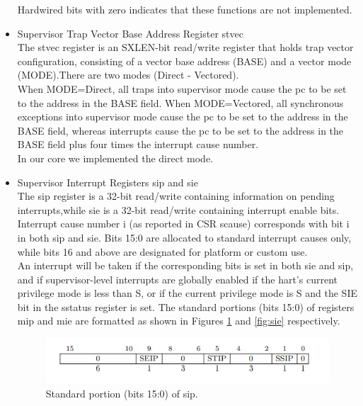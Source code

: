\documentclass[../main.tex]{subfiles}
\begin{document}
\begin{itemize}
        Hardwired bits with zero indicates that these functions are not implemented.
         
    \item Supervisor Trap Vector Base Address Register stvec \\
        The stvec register is an SXLEN-bit read/write register that holds trap vector configuration, consisting of a vector base address (BASE) and a vector mode (MODE).There are two modes (Direct - Vectored).\\ 
        When MODE=Direct, all traps into  supervisor mode cause the pc to be set to the address in the BASE field. When MODE=Vectored, all synchronous exceptions into supervisor mode cause the pc to be set to the address in the BASE field, whereas interrupts cause the pc to be set to the address in the BASE field plus four times the interrupt cause number.\\
        In our core we implemented the direct mode.
          
    \item Supervisor Interrupt Registers sip and sie\\
        The sip register is a 32-bit read/write containing information on pending interrupts,while sie is a 32-bit read/write containing interrupt enable bits. Interrupt cause number i (as reported in CSR scause) corresponds with bit i in both sip and sie. Bits 15:0 are allocated to standard interrupt causes only, while bits 16 and above are designated for platform or custom use.\\
        An interrupt will be taken if the corresponding bits is set in both sie and sip, and if supervisor-level interrupts are globally enabled if the hart’s current privilege mode is less than S, or if the current privilege mode is S and the SIE bit in the sstatus register is set. The standard portions (bits 15:0) of registers mip and mie are formatted as shown in Figures \ref{fig:sip} and \ref{fig:sie} respectively.
        
        \begin{figure}[h]
            \centering
            \includegraphics[width=12 cm]{diagrams/sip.PNG}
            \caption{Standard portion (bits 15:0) of sip.}
            \label{fig:sip}
        \end{figure}
            

\end{itemize}
\end{document}
